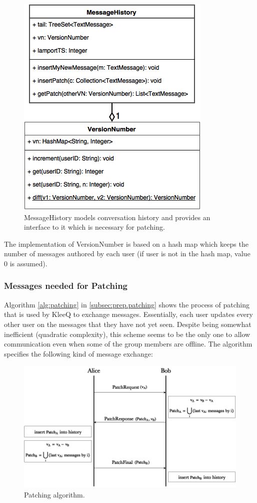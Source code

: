 \documentclass[a4paper, twoside, 12pt]{report}
\begin{document}
\begin{figure}[H]
    \captionsetup{width=0.76\textwidth}
    \centering
    \includegraphics[width=0.4\linewidth]{pics/history_uml.png}
    \caption{\label{fig:history_uml} MessageHistory models conversation history and provides an interface to it which is necessary for patching.}
\end{figure}
The implementation of VersionNumber is based on a hash map which keeps the number of messages authored by each user (if user is not in the hash map, value 0 is assumed).



\subsubsection{Messages needed for Patching}
Algorithm \ref{alg:patching} in \cref{subsec:prep.patching} shows the process of patching that is used by KleeQ to exchange messages. Essentially, each user updates every other user on the messages that they have not yet seen. Despite being somewhat inefficient (quadratic complexity), this scheme seems to be the only one to allow communication even when some of the group members are offline. The algorithm specifies the following kind of message exchange:

\begin{figure}[H]
    \captionsetup{width=0.76\textwidth}
    \centering
    \includegraphics[width=0.8\linewidth]{pics/patching_orig.png}
    \caption{\label{fig:patching_orig} Patching algorithm.}
\end{figure}
\end{document}
